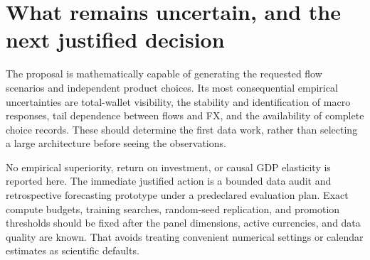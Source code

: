 \section{What remains uncertain, and the next justified decision}
The proposal is mathematically capable of generating the requested flow scenarios and independent product choices. Its most consequential empirical uncertainties are total-wallet visibility, the stability and identification of macro responses, tail dependence between flows and FX, and the availability of complete choice records. These should determine the first data work, rather than selecting a large architecture before seeing the observations.

No empirical superiority, return on investment, or causal GDP elasticity is reported here. The immediate justified action is a bounded data audit and retrospective forecasting prototype under a predeclared evaluation plan. Exact compute budgets, training searches, random-seed replication, and promotion thresholds should be fixed after the panel dimensions, active currencies, and data quality are known. That avoids treating convenient numerical settings or calendar estimates as scientific defaults.
